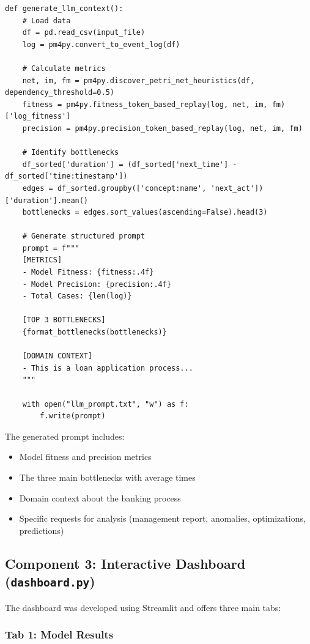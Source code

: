 \documentclass[a4paper,twoside,12pt]{article}
\begin{document}
\begin{lstlisting}[caption={LLM prompt generation}]
def generate_llm_context():
    # Load data
    df = pd.read_csv(input_file)
    log = pm4py.convert_to_event_log(df)
    
    # Calculate metrics
    net, im, fm = pm4py.discover_petri_net_heuristics(df, dependency_threshold=0.5)
    fitness = pm4py.fitness_token_based_replay(log, net, im, fm)['log_fitness']
    precision = pm4py.precision_token_based_replay(log, net, im, fm)
    
    # Identify bottlenecks
    df_sorted['duration'] = (df_sorted['next_time'] - df_sorted['time:timestamp'])
    edges = df_sorted.groupby(['concept:name', 'next_act'])['duration'].mean()
    bottlenecks = edges.sort_values(ascending=False).head(3)
    
    # Generate structured prompt
    prompt = f"""
    [METRICS]
    - Model Fitness: {fitness:.4f}
    - Model Precision: {precision:.4f}
    - Total Cases: {len(log)}
    
    [TOP 3 BOTTLENECKS]
    {format_bottlenecks(bottlenecks)}
    
    [DOMAIN CONTEXT]
    - This is a loan application process...
    """
    
    with open("llm_prompt.txt", "w") as f:
        f.write(prompt)
\end{lstlisting}

The generated prompt includes:
\begin{itemize}
    \item Model fitness and precision metrics
    \item The three main bottlenecks with average times
    \item Domain context about the banking process
    \item Specific requests for analysis (management report, anomalies, optimizations, predictions)
\end{itemize}

\subsection{Component 3: Interactive Dashboard (\texttt{dashboard.py})}

The dashboard was developed using Streamlit and offers three main tabs:

\subsubsection{Tab 1: Model Results}
\end{document}
